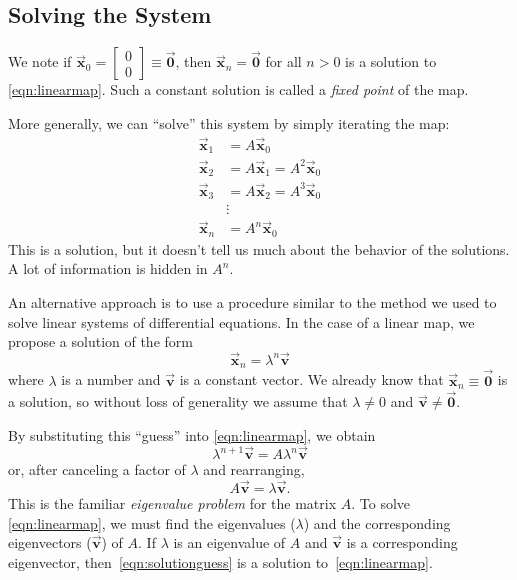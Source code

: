 \documentclass{book}
\newcommand{\BV}{\vec{\textbf{v}}}
\newcommand{\BX}{\vec{\textbf{x}}}
\newcommand{\BZ}{\vec{\textbf{0}}}  %
\begin{document}
\subsection*{Solving the System}
We note if $\BX_0 = \begin{bmatrix}0 \\ 0\end{bmatrix} \equiv \BZ$, then $\BX_n = \BZ$ for all $n>0$ is a solution to \eqref{eqn:linearmap}.
Such a constant solution is called a \emph{fixed point}
of the map.

More generally, we can ``solve'' this system by simply iterating the
map:
\begin{equation}
\begin{split}
  \BX_1 & = A\BX_0 \\
  \BX_2 & = A\BX_1 = A^2\BX_0 \\
  \BX_3 & = A\BX_2 = A^3\BX_0 \\
        & \vdots \\
  \BX_n & = A^n\BX_0
\end{split}
\end{equation}
This is a solution, but it doesn't tell us much about the
behavior of the solutions.  A lot of information is hidden
in $A^n$.

An alternative approach is to use a procedure similar to the
method we used to solve linear systems of differential equations.
In the case of a linear map, we propose a solution of the
form
\begin{equation}
   \BX_n = \lambda^n \BV
\label{eqn:solutionguess}
\end{equation}
where $\lambda$ is a number and $\BV$ is a constant vector.
We already know that $\BX_n\equiv\BZ$ is a solution, so without
loss of generality we assume that $\lambda\ne 0$ and
$\BV \ne \BZ$.

By substituting this ``guess'' into \eqref{eqn:linearmap},
we obtain
\begin{equation}
  \lambda^{n+1} \BV  = A\lambda^n\BV
\end{equation}
or, after canceling a factor of $\lambda$ and rearranging,
\begin{equation}
   A\BV = \lambda \BV.
\label{eqn:mapeigenvalueprob}
\end{equation}
This is the familiar \emph{eigenvalue problem}
for the matrix $A$.
To solve \eqref{eqn:linearmap}, we must find
the eigenvalues ($\lambda$) and
the corresponding eigenvectors ($\BV$) of $A$.
If $\lambda$ is an eigenvalue of $A$ and $\BV$ is a corresponding
eigenvector, then~\eqref{eqn:solutionguess} is a solution
to~\eqref{eqn:linearmap}.
\end{document}
